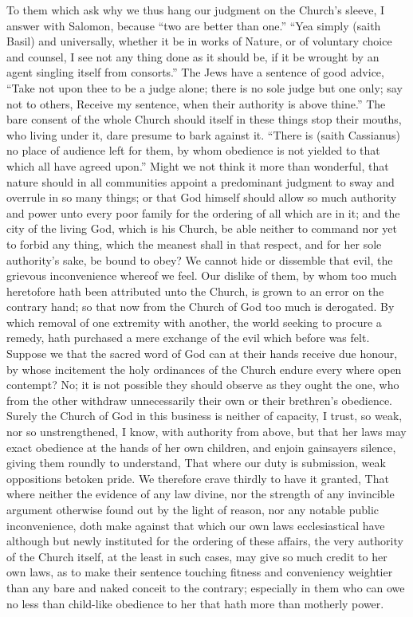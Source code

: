 To them which ask why we thus hang our judgment on the Church’s sleeve, I answer with Salomon, because “two are better than one.” “Yea simply (saith Basil) and universally, whether it be in works of Nature, or of voluntary choice and counsel, I see not any thing done as it should be, if it be wrought by an agent singling itself from consorts.” The Jews have a sentence of good advice, “Take not upon thee to be a judge alone; there is no sole judge but one only; say not to others, Receive my sentence, when their authority is above thine.” The bare consent of the whole Church should itself in these things stop their mouths,  who living under it, dare presume to bark against it. “There is (saith Cassianus) no place of audience left for them, by whom obedience is not yielded to that which all have agreed upon.” Might we not think it more than wonderful, that nature should in all communities appoint a predominant judgment to sway and overrule in so many things; or that God himself should allow so much authority and power unto every poor family for the ordering of all which are in it; and the city of the living God, which is his Church, be able neither to command nor yet to forbid any thing, which the meanest shall in that respect, and for her sole authority’s sake, be bound to obey?
We cannot hide or dissemble that evil, the grievous inconvenience whereof we feel. Our dislike of them, by whom too much heretofore hath been attributed unto the Church, is grown to an error on the contrary hand; so that now from the Church of God too much is derogated. By which removal of one extremity with another, the world seeking to procure a remedy, hath purchased a mere exchange of the evil which before was felt.
Suppose we that the sacred word of God can at their hands receive due honour, by whose incitement the holy ordinances of the Church endure every where open contempt? No; it is not possible they should observe as they ought the one, who from the other withdraw unnecessarily their own or their brethren’s obedience.
Surely the Church of God in this business is neither of capacity, I trust, so weak, nor so unstrengthened, I know, with authority from above, but that her laws may exact obedience at the hands of her own children, and enjoin gainsayers silence, giving them roundly to understand, That where our duty is submission, weak oppositions betoken pride.
We therefore crave thirdly to have it granted, That where neither the evidence of any law divine, nor the strength of any invincible argument otherwise found out by the light of reason, nor any notable public inconvenience, doth make  against that which our own laws ecclesiastical have although but newly instituted for the ordering of these affairs, the very authority of the Church itself, at the least in such cases, may give so much credit to her own laws, as to make their sentence touching fitness and conveniency weightier than any bare and naked conceit to the contrary; especially in them who can owe no less than child-like obedience to her that hath more than motherly power.


